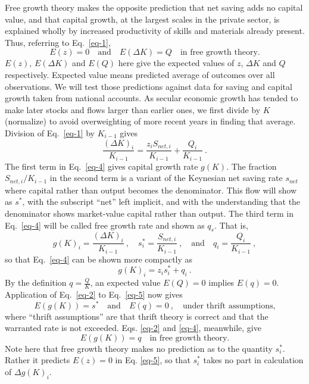\documentclass[a4paper,fleqn]{latex_styles/cas-sc}
\begin{document}
Free growth theory makes the opposite prediction that net saving adds no capital value, and that capital growth, at the largest scales in the private sector, is explained wholly by increased productivity of skills and materials already present. Thus, referring to Eq.~\eqref{eq-1},
%
\begin{equation}
    E(z) = 0 \quad \text{and} \quad E(\Delta K) = Q \quad \text{in free growth theory.} \label{eq-3}
\end{equation}
%
\(E(z)\), \(E(\Delta K)\) and \(E(Q)\) here give the expected values of \(z\), \(\Delta K\)
and \(Q\) respectively. Expected value means predicted average of outcomes
over all observations.
We will test those predictions against data for saving and capital growth taken from national accounts.
As secular economic growth has tended to make
later stocks and flows larger than earlier ones, we first divide by
\(K\) (normalize) to avoid overweighting of more recent years in finding
that average. Division of Eq.~\eqref{eq-1} by \(K_{i - 1}\) gives
%
\begin{equation}
    \frac{(\Delta K)_{i}}{K_{i - 1}} = \frac{z_i S_{net,i}}{K_{i - 1}} + \frac{Q_{i}}{K_{i - 1}} \ .\label{eq-4}
\end{equation}
%
The first term in Eq.~\eqref{eq-4} gives capital growth rate \(g(K)\). The fraction \(S_{net,i}/K_{i-1}\) in the second term is a
variant of the Keynesian net saving rate \(s_{net}\) where capital
rather than output becomes the denominator. This flow will show 
as \(s^{*}\), with the subscript ``net''
left implicit, and with the understanding that the denominator shows
market-value capital rather than output.
The third term in Eq.~\eqref{eq-4} will be called free growth rate and
shown as \(q_s\). That is,
%
\[g{(K)}_{i} = \frac{(\Delta K)_{i}}{K_{i - 1}} \ , \quad
s^{*}_{i} = \frac{S_{net,i}}{K_{i - 1}} \ , \quad \text{and} \quad
q_{i} = \frac{Q_{i}}{K_{i - 1}} \ ,\]
%
so that Eq.~\eqref{eq-4} can be shown more compactly as
%
\begin{equation}
g(K)_{i} = z_i s^{*}_{i} + q_{i} \ .\label{eq-5}
\end{equation}
%
By the definition \(q = \frac{Q}{K}\), an expected value \(E(Q) = 0\)
implies \(E(q) = 0\). Application of Eq.~\eqref{eq-2} to
Eq.~\eqref{eq-5} now gives
%
\begin{equation}
    E(g(K)) = s^* \quad \text{and} \quad E(q) = 0\ , \quad \text{under thrift assumptions,}\label{eq-6}
\end{equation}
%
where ``thrift assumptions'' are that thrift theory is correct and that
the warranted rate is not exceeded. Eqs. \eqref{eq-2} and \eqref{eq-4}, meanwhile, give
%
\begin{equation}
    E(g(K)) = q \quad \text{in free growth theory.}\label{eq-7}
\end{equation}
%
Note here that free growth theory makes no prediction as to the quantity \(s^*_i\). Rather it predicts \(E(z)=0\) in Eq. \eqref{eq-5}, so that \(s^*_i\) takes no part in calculation of \(\Delta g(K)_i\). 
\end{document}
